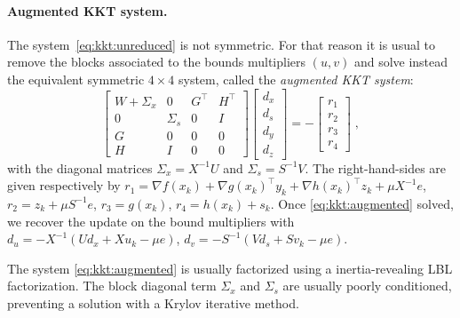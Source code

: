 \paragraph{Augmented KKT system.}
The system~\eqref{eq:kkt:unreduced} is not symmetric. For
that reason it is usual to remove the blocks associated
to the bounds multipliers $(u, v)$ and solve instead the equivalent
symmetric $4 \times 4$ system, called the \emph{augmented KKT system}:
\begin{equation}
  \label{eq:kkt:augmented}
  \tag{$K_2$}
  \begin{bmatrix}
    W + \Sigma_x & 0 & G^\top & H^\top \\
    0 & \Sigma_s & 0& I \\
    G & 0 & 0 & 0 \\
    H & I & 0 & 0
  \end{bmatrix}
  \begin{bmatrix}
    d_x \\
    d_s \\
    d_y \\
    d_z
  \end{bmatrix}
  = - \begin{bmatrix}
    r_1 \\ r_2 \\ r_3 \\ r_4
  \end{bmatrix} \; ,
\end{equation}
with the diagonal matrices $\Sigma_x = X^{-1} U$ and $\Sigma_s = S^{-1} V$.
The right-hand-sides are given respectively by
$r_1 = \nabla f(x_k) + \nabla g(x_k)^\top y_k + \nabla h(x_k)^\top z_k + \mu X^{-1} e$,
$r_2 = z_k + \mu S^{-1} e$,
$r_3 = g(x_k)$,
$r_4 = h(x_k) + s_k$.
Once \eqref{eq:kkt:augmented} solved, we recover the
update on the bound multipliers with
$d_u = - X^{-1}(U d_x + X u_k - \mu e)$,
$d_v = - S^{-1}(V d_s + S v_k - \mu e)$.

The system \eqref{eq:kkt:augmented} is usually factorized using
a inertia-revealing LBL factorization. The block diagonal term
$\Sigma_x$ and $\Sigma_s$ are usually poorly conditioned, preventing
a solution with a Krylov iterative method.

